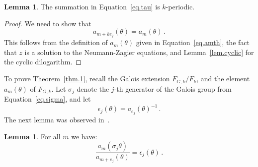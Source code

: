 \documentclass[12pt]{amsart}
\theoremstyle{definition}
\newtheorem{lemma}[theorem]{Lemma}
\def\e{\epsilon}
\def\th{\theta}
\def\be{  \begin{equation} }
\def\ee{  \end{equation} }
\begin{document}
\begin{lemma}
\label{lem.periodic}\cite{GZ1}
The summation in Equation~\eqref{eq.tau} is $k$-periodic.
\end{lemma}

\begin{proof}
We need to show that
$$
a_{m+k e_j}(\theta)=a_m(\theta) \,.
$$
This follows from the definition of $a_m(\th)$ given in 
Equation~\eqref{eq.amth}, the fact that $z$ is a solution to
the Neumann-Zagier equations, and Lemma~\ref{lem.cyclic} for the cyclic 
dilogarithm.
\end{proof}

To prove Theorem~\ref{thm.1}, recall the Galois extension $F_{G,k}/F_k$, 
and the element $a_m(\th)$ of $F_{G,k}$. Let $\sigma_j$ denote the 
$j$-th generator of the Galois group from Equation~\eqref{eq.sigma}, and let 
\be
\e_j(\th)=a_{e_j}(\th)^{-1} \,.
\ee
The next lemma was observed in~\cite{GZ1}.

\begin{lemma}
\label{lem.asigma}\cite{GZ1}
For all $m$ we have: 
\be
\frac{a_{m}(\sigma_j\th)}{a_{m+e_j}(\th)} = \e_j(\th) \,.
\ee
\end{lemma}
\end{document}
